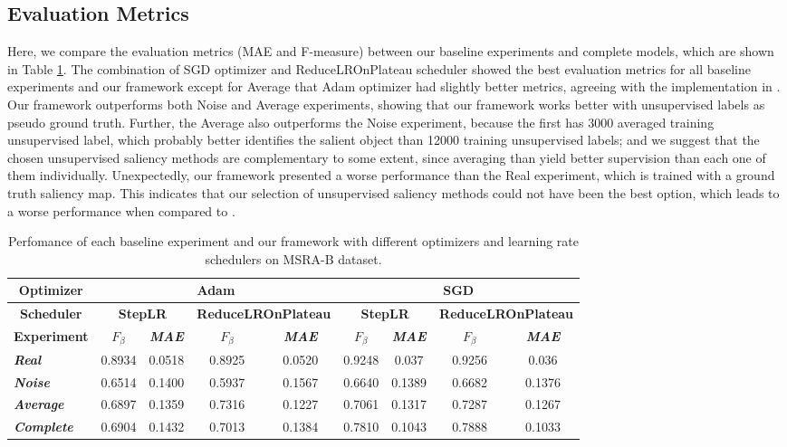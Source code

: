 \documentclass{article}
\begin{document}
\subsection{Evaluation Metrics}
\label{section:evaluation_metrics}

Here, we compare the evaluation metrics (MAE and F-measure) between our baseline experiments and complete models, which are shown in Table \ref{tab:comp}. The combination of SGD optimizer and ReduceLROnPlateau scheduler showed the best evaluation metrics for all baseline experiments and our framework except for Average that Adam optimizer had slightly better metrics, agreeing with the implementation in \cite{zhang2018}. Our framework outperforms both Noise and Average experiments, showing that our framework works better with unsupervised labels as pseudo ground truth. Further, the Average also outperforms the Noise experiment, because the first has 3000 averaged training unsupervised label, which probably better identifies the salient object than 12000 training unsupervised labels; and we suggest that the chosen unsupervised saliency methods are complementary to some extent, since averaging than yield better supervision than each one of them individually. Unexpectedly, our framework presented a worse performance than the Real experiment, which is trained with a ground truth saliency map. This indicates that our selection of unsupervised saliency methods could not have been the best option, which leads to a worse performance when compared to \cite{zhang2018}.

\begin{table}[h]
  \centering
  \begin{tabular}{|l|c|c|c|c|c|c|c|c|}
  \hline
  \multicolumn{1}{|c|}{\textbf{Optimizer}} & \multicolumn{4}{c|}{\textbf{Adam}} & \multicolumn{4}{c|}{\textbf{SGD}} \\ \hline
  \multicolumn{1}{|c|}{\textbf{Scheduler}} & \multicolumn{2}{c|}{\textbf{StepLR}} & \multicolumn{2}{c|}{\textbf{ReduceLROnPlateau}} & \multicolumn{2}{c|}{\textbf{StepLR}} & \multicolumn{2}{c|}{\textbf{ReduceLROnPlateau}} \\ \hline
  \textbf{Experiment} & \textit{\textbf{$F_\beta$}} & \textit{\textbf{MAE}} & \textit{\textbf{$F_\beta$}} & \textit{\textbf{MAE}} & \textit{\textbf{$F_\beta$}} & \textit{\textbf{MAE}} & \textit{\textbf{$F_\beta$}} & \textit{\textbf{MAE}} \\ \hline
  \textit{\textbf{Real}} & 0.8934 & 0.0518 & 0.8925 & 0.0520 & 0.9248 & 0.037 & 0.9256 & 0.036 \\ \hline
  \textit{\textbf{Noise}} & 0.6514 & 0.1400 & 0.5937 & 0.1567 & 0.6640 & 0.1389 & 0.6682 & 0.1376 \\ \hline
  \textit{\textbf{Average}} & 0.6897 & 0.1359 & 0.7316 & 0.1227 & 0.7061 & 0.1317 & 0.7287 & 0.1267 \\ \hline
  \textit{\textbf{Complete}} & 0.6904 & 0.1432 & 0.7013 & 0.1384 & 0.7810 & 0.1043 & 0.7888 & 0.1033 \\ \hline
  \end{tabular}
  \caption{Perfomance of each baseline experiment and our framework with different optimizers and learning rate schedulers on MSRA-B dataset.}
  \label{tab:comp}
\end{table}
\end{document}
